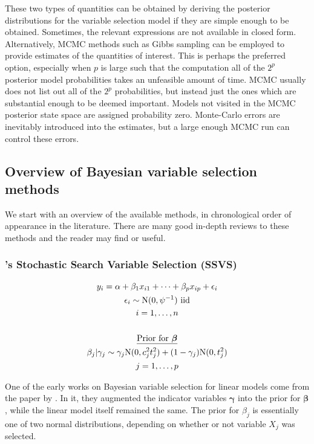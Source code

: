 These two types of quantities can be obtained by deriving the posterior distributions for the variable selection model if they are simple enough to be obtained. Sometimes, the relevant expressions are not available in closed form. Alternatively, MCMC methods such as Gibbs sampling can be employed to provide estimates of the quantities of interest. This is perhaps the preferred option, especially when $p$ is large such that the computation all of the $2^p$ posterior model probabilities takes an unfeasible amount of time. MCMC usually does not list out all of the $2^p$ probabilities, but instead just the ones which are substantial enough to be deemed important. Models not visited in the MCMC posterior state space are assigned probability zero. Monte-Carlo errors are inevitably introduced into the estimates, but a large enough MCMC run can control these errors.

\subsection{Overview of Bayesian variable selection methods}

We start with an overview of the available methods, in chronological order of appearance in the literature. There are many good in-depth reviews to these methods and the reader may find \cite{OHara2009} or \cite{Chipman2008} useful. 

\subsubsection{\texorpdfstring{\citeauthor{George1993}'s}{George and McCulloch's} Stochastic Search Variable Selection (SSVS)}

\begin{align}
	\begin{gathered} 
	y_i = \alpha + \beta_1 x_{i1} + \dots + \beta_p x_{ip} + \epsilon_i \\
	\epsilon_i \sim \text{N}(0, \psi^{-1}) \text{ iid} \\
	i = 1,\dots,n \\
	\\
	\text{\underline{Prior for $\boldsymbol\beta$}} \\
	\beta_j|\gamma_j \sim \gamma_j\text{N}(0,c^2_jt^2_j) + (1-\gamma_j)\text{N}(0,t^2_j) \\
	j=1,\dots,p
	\end{gathered}
\end{align}

One of the early works on Bayesian variable selection for linear models come from the \citeyear{George1993} paper by \citeauthor{George1993}. In it, they augmented the indicator variables $\boldsymbol\gamma$ into the prior for $\boldsymbol\beta$, while the linear model itself remained the same. The prior for $\beta_j$ is essentially one of two normal distributions, depending on whether or not variable $X_j$ was selected. 

